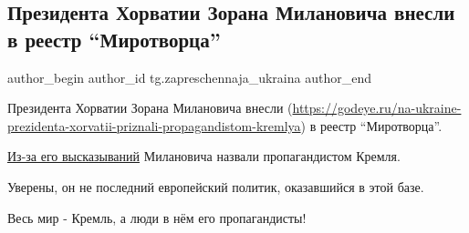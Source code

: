  
 
 
 
 
 
\subsection{Президента Хорватии Зорана Милановича внесли в реестр \enquote{Миротворца}}
\label{sec:26_01_2022.tg.zapreschennaja_ukraina.1.prezident_horvatii_mirotvorec}
 
\ifcmt
 author_begin
   author_id tg.zapreschennaja_ukraina
 author_end
\fi

Президента Хорватии Зорана Милановича внесли
(\url{https://godeye.ru/na-ukraine-prezidenta-xorvatii-priznali-propagandistom-kremlya})
в реестр \enquote{Миротворца}.

\href{https://t.me/godeye_ru/10269}{Из-за его высказываний} Милановича назвали пропагандистом Кремля.

Уверены, он не последний европейский политик, оказавшийся в этой базе.

Весь мир - Кремль, а люди в нём его пропагандисты!

